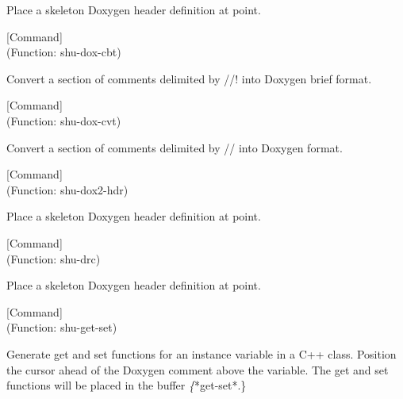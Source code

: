 \begin{doc-string}
Place a skeleton Doxygen header definition at point.
\end{doc-string}

\vspace{1em}
\noindent
{}
\usebox{\funcname}
 \hfill [Command]\\%
 (Function: shu-dox-cbt)

\begin{doc-string}
Convert a section of comments delimited by //! into Doxygen brief format.
\end{doc-string}

\vspace{1em}
\noindent
{}
\usebox{\funcname}
 \hfill [Command]\\%
 (Function: shu-dox-cvt)

\begin{doc-string}
Convert a section of comments delimited by // into Doxygen format.
\end{doc-string}

\vspace{1em}
\noindent
{}
\usebox{\funcname}
 \hfill [Command]\\%
 (Function: shu-dox2-hdr)

\begin{doc-string}
Place a skeleton Doxygen header definition at point.
\end{doc-string}

\vspace{1em}
\noindent
{}
\usebox{\funcname}
 \hfill [Command]\\%
 (Function: shu-drc)

\begin{doc-string}
Place a skeleton Doxygen header definition at point.
\end{doc-string}

\vspace{1em}
\noindent
{}
\usebox{\funcname}
 \hfill [Command]\\%
 (Function: shu-get-set)

\begin{doc-string}
Generate get and set functions for an instance variable in a C++ class.
Position the cursor ahead of the Doxygen comment above the variable.  The get
and set functions will be placed in the buffer \emph\{*get-set*.\}
\end{doc-string}


